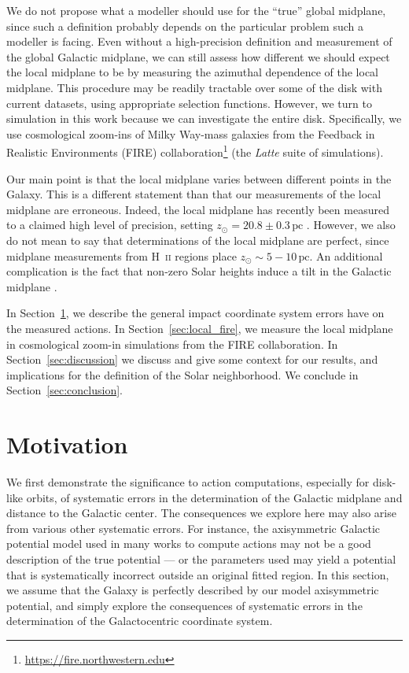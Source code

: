 \documentclass[twocolumn]{aastex62}
\newcommand{\pc}{\text{pc}}
\begin{document}
We do not propose what a modeller should use for the ``true'' global midplane,
since such a definition probably depends on the particular problem such a
modeller is facing. Even without a high-precision definition and measurement
of the global Galactic midplane, we can still assess how different we should
expect the local midplane to be by measuring the azimuthal dependence of the
local midplane. This procedure may be readily tractable over some of the disk
with current datasets, using appropriate selection functions. However, we turn
to simulation in this work because we can investigate the entire disk.
Specifically, we use cosmological zoom-ins of Milky Way-mass galaxies from the
Feedback in Realistic Environments (FIRE)
collaboration\footnote{\url{https://fire.northwestern.edu}} (the {\em Latte}
suite of simulations).

Our main point is that the local midplane varies between different points in
the Galaxy. This is a different statement than that our measurements of the
local midplane are erroneous. Indeed, the local midplane has recently been
measured to a claimed high level of precision, setting $z_{\odot} = 20.8 \pm
0.3\,\pc$ \citep{2019MNRAS.482.1417B}. However, we also do not mean to say
that determinations of the local midplane are perfect, since midplane
measurements from H~\textsc{ii} regions place $z_{\odot} \sim 5-10\,\pc$. An
additional complication is the fact that non-zero Solar heights induce a tilt
in the Galactic midplane \citep{2014ApJ...797...53G,2016ARAA..54..529B}.

In Section~\ref{sec:ref_frame}, we describe the general impact coordinate
system errors have on the measured actions. In Section~\ref{sec:local_fire},
we measure the local midplane in cosmological zoom-in simulations from the
FIRE collaboration. In Section~\ref{sec:discussion} we discuss and give some
context for our results, and implications for the definition of the Solar
neighborhood. We conclude in Section~\ref{sec:conclusion}.

\section{Motivation} \label{sec:ref_frame}
We first demonstrate the significance to action computations, especially for
disk-like orbits, of systematic errors in the determination of the Galactic
midplane and distance to the Galactic center. The consequences we explore here
may also arise from various other systematic errors. For instance, the
axisymmetric Galactic potential model used in many works to compute actions
may not be a good description of the true potential --- or the parameters used
may yield a potential that is systematically incorrect outside an original
fitted region. In this section, we assume that the Galaxy is perfectly
described by our model axisymmetric potential, and simply explore the
consequences of systematic errors in the determination of the Galactocentric
coordinate system.
\end{document}
